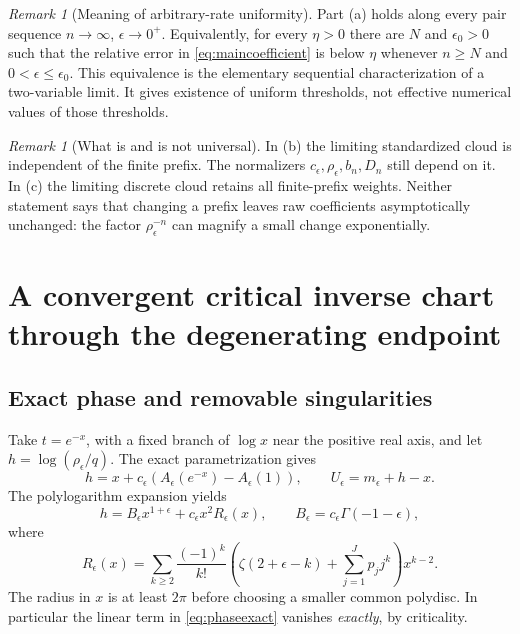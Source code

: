 \documentclass[11pt,a4paper]{article}
\numberwithin{equation}{section}
\theoremstyle{definition}
\theoremstyle{remark}
\newtheorem{remark}[theorem]{Remark}
\newcommand{\ee}{\epsilon}
\begin{document}
\begin{remark}[Meaning of arbitrary-rate uniformity]\label{rem:uniform}
Part (a) holds along every pair sequence $n\to\infty$, $\ee\to0^+$.
Equivalently, for every $\eta>0$ there are $N$ and $\ee_0>0$ such that the
relative error in \eqref{eq:maincoefficient} is below $\eta$ whenever
$n\ge N$ and $0<\ee\le\ee_0$. This equivalence is the elementary
sequential characterization of a two-variable limit. It gives existence
of uniform thresholds, not effective numerical values of those thresholds.
\end{remark}

\begin{remark}[What is and is not universal]
In (b) the limiting standardized cloud is independent of the finite
prefix. The normalizers $c_\ee,\rho_\ee,b_n,D_n$ still depend on it.
In (c) the limiting discrete cloud retains all finite-prefix weights.
Neither statement says that changing a prefix leaves raw coefficients
asymptotically unchanged: the factor $\rho_\ee^{-n}$ can magnify a small
change exponentially.
\end{remark}

\section{A convergent critical inverse chart through the degenerating endpoint}
\label{sec:chart}

\subsection{Exact phase and removable singularities}
Take $t=e^{-x}$, with a fixed branch of $\log x$ near the positive real
axis, and let $h=\log(\rho_\ee/q)$. The exact parametrization gives
\begin{equation}\label{eq:phaseexact}
 h=x+c_\ee(A_\ee(e^{-x})-A_\ee(1)),\qquad
 U_\ee=m_\ee+h-x.
\end{equation}
The polylogarithm expansion \cite[Eq.~25.12.12]{dlmf} yields
\begin{equation}\label{eq:phase}
 h=B_\ee x^{1+\ee}+c_\ee x^2 R_\ee(x),\qquad
 B_\ee=c_\ee\Gamma(-1-\ee),
\end{equation}
where
\begin{equation}\label{eq:R}
 R_\ee(x)=\sum_{k\ge2}\frac{(-1)^k}{k!}
 \left(\zeta(2+\ee-k)+\sum_{j=1}^Jp_jj^k\right)x^{k-2}.
\end{equation}
The radius in $x$ is at least $2\pi$ before choosing a smaller common
polydisc. In particular the linear term in \eqref{eq:phaseexact} vanishes
\emph{exactly}, by criticality.
\end{document}
